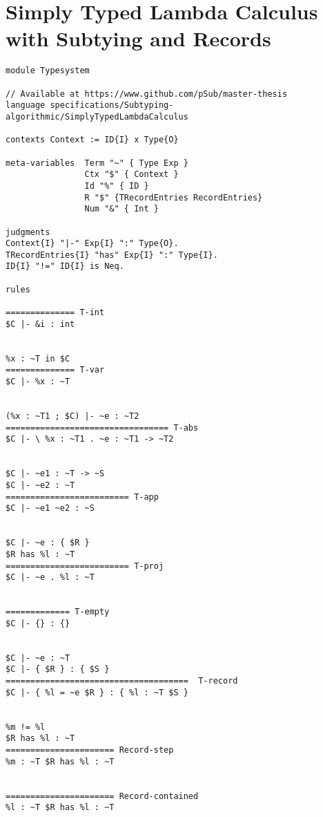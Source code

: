 \newpage
\section{Simply Typed Lambda Calculus with Subtying and Records}
\label{appendix:stlc-records}

\begin{lstlisting}[language=sltc]
module Typesystem

// Available at https://www.github.com/pSub/master-thesis
language specifications/Subtyping-algorithmic/SimplyTypedLambdaCalculus

contexts Context := ID{I} x Type{O}

meta-variables  Term "~" { Type Exp }
                Ctx "$" { Context }
                Id "%" { ID }
                R "$" {TRecordEntries RecordEntries}
                Num "&" { Int }

judgments
Context{I} "|-" Exp{I} ":" Type{O}.
TRecordEntries{I} "has" Exp{I} ":" Type{I}.
ID{I} "!=" ID{I} is Neq.

rules

============== T-int
$C |- &i : int


%x : ~T in $C
============== T-var
$C |- %x : ~T


(%x : ~T1 ; $C) |- ~e : ~T2
================================= T-abs
$C |- \ %x : ~T1 . ~e : ~T1 -> ~T2


$C |- ~e1 : ~T -> ~S
$C |- ~e2 : ~T
========================= T-app
$C |- ~e1 ~e2 : ~S


$C |- ~e : { $R }
$R has %l : ~T
========================= T-proj
$C |- ~e . %l : ~T


============= T-empty
$C |- {} : {}


$C |- ~e : ~T
$C |- { $R } : { $S }
=====================================  T-record
$C |- { %l = ~e $R } : { %l : ~T $S }


%m != %l
$R has %l : ~T
====================== Record-step
%m : ~T $R has %l : ~T 


====================== Record-contained
%l : ~T $R has %l : ~T
\end{lstlisting}
\newpage
